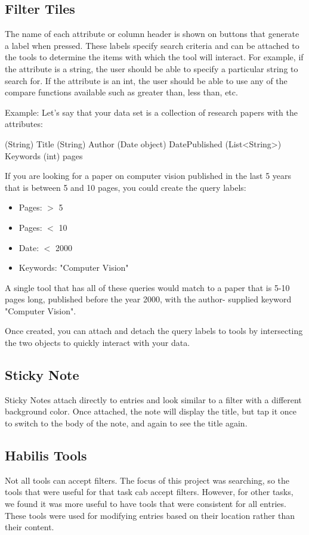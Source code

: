 \documentclass{article}
\begin{document}
\subsection{Filter Tiles}
The name of each attribute or column header is shown on buttons that generate a label when pressed. These labels specify search criteria and can be attached to the tools to determine the items with which the tool will interact. For example, if the attribute is a string, the user should be able to specify a particular string to search for. If the attribute is an int, the user should be able to use any of the compare functions available such as greater than, less than, etc. 

Example: Let's say that your data set is a collection of research papers with the attributes: 

(String) Title
(String) Author
(Date object) DatePublished
(List<String>) Keywords
(int) pages

If you are looking for a paper on computer vision published in the last 5 years that is between 5 and 10 pages, you could create the query labels:
\begin{itemize}
\item Pages: $>$ 5
\item Pages: $<$ 10
\item Date: $<$ 2000
\item Keywords: "Computer Vision"

\end{itemize}

A single tool that has all of these queries would match to a paper that is 5-10 pages long, published before the year 2000, with the author- supplied keyword "Computer Vision".


Once created, you can attach and detach the query labels to tools by intersecting the two objects to quickly interact with your data.

\subsection*{Sticky Note}
Sticky Notes attach directly to entries and look similar to a filter with a different background color.  Once attached, the note will display the title, but tap it once to switch to the body of the note, and again to see the title again.
\subsection{Habilis Tools}
Not all tools can accept filters.  The focus of this project was searching, so the tools that were useful for that task cab accept filters. However, for other tasks, we found it was more useful to have tools that were consistent for all entries.  These tools were used for modifying entries based on their location rather than their content.   	
\end{document}
